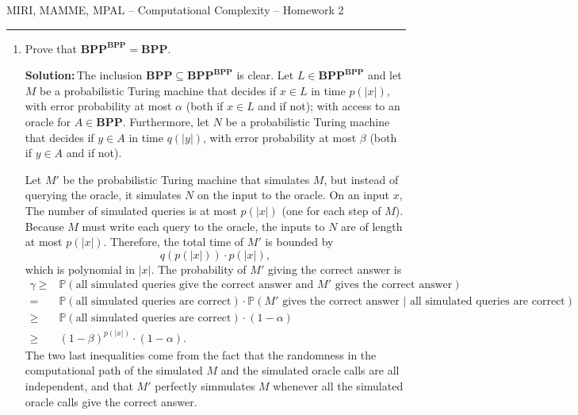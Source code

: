 \documentclass{amsart}
\theoremstyle{plain}
\theoremstyle{definition}
\newcommand{\bpp}{\textbf{BPP}}
\newcommand{\sol}{\textbf{Solution:\,}}
\begin{document}
    {\Large MIRI, MAMME, MPAL -- Computational Complexity -- Homework 2}

    \vspace{0.5cm}

    \hrule

    \vspace{0.5cm}

    \begin{enumerate}[label=\textbf{Exercise \arabic*:}, leftmargin=0cm, labelwidth=-0.2cm, align=left]

        \item Prove that $\bpp^{\bpp} = \bpp$.

            \sol The inclusion $\bpp \subseteq \bpp^{\bpp}$ is clear.
            Let $L \in \bpp^{\bpp}$ and let $M$ be a probabilistic Turing machine
            that decides if $x \in L$
            in time $p(|x|)$, with error probability at most $\alpha$
            (both if $x \in L$ and if not);
            with access to an oracle for
            $A \in \bpp$.
            Furthermore, let $N$ be a probabilistic Turing machine that decides if $y \in A$
            in time $q(|y|)$,
            with error probability at most $\beta$
            (both if $y \in A$ and if not).

            Let $M'$ be the probabilistic Turing machine that simulates $M$,
            but instead of querying the oracle, it simulates $N$ on the input
            to the oracle.
            On an input $x$,
            The number of simulated queries is at most $p(|x|)$
            (one for each step of $M$).
            Because $M$ must write each query to the oracle,
            the inputs to $N$ are of length at most $p(|x|)$.
            Therefore, the total time of $M'$ is bounded by
            \[
               q(p(|x|)) \cdot p(|x|),
            \]
            which is polynomial in $|x|$.
            The probability of $M'$ giving the correct answer is
            \begin{align*}
                \gamma \geq & \mathbb{P}(\text{all simulated queries give the correct answer and } M' \text{ gives the correct answer}) \\
                = & \mathbb{P}(\text{all simulated queries are correct}) \cdot \mathbb{P}(M' \text{ gives the correct answer } | \text{ all simulated queries are correct}) \\
                \geq & \mathbb{P}(\text{all simulated queries are correct}) \cdot (1 - \alpha) \\
                \geq & (1 - \beta)^{p(|x|)} \cdot (1 - \alpha).
            \end{align*}
            The two last inequalities come from the fact that the randomness in the computational path
            of the simulated $M$ and the simulated oracle calls are all independent, and that
            $M'$ perfectly simmulates $M$ whenever all the simulated oracle calls give the correct answer.


\end{enumerate}
\end{document}
